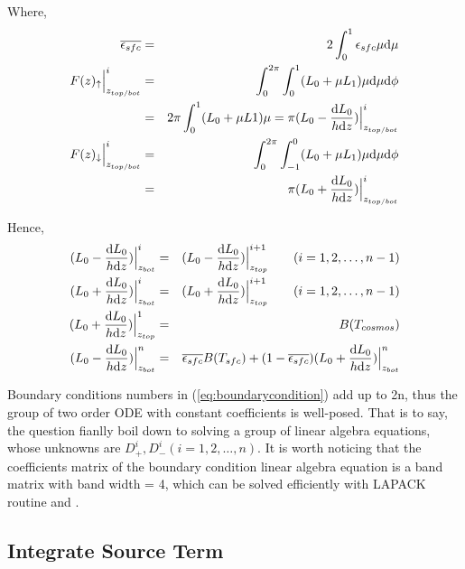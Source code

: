 \documentclass[a4paper]{report}
\begin{document}
Where,
\begin{eqnarray} \label{eq:epsilonbar}
    \overline{\epsilon_{sfc}} & = & 2\int_{0}^{1}\epsilon_{sfc}\mu \mathrm{d} \mu \nonumber\\
    F(z)_{\uparrow}\Big|_{z_{top/bot}}^{i} & = & \int_{0}^{2\pi}\int_{0}^{1}(L_{0} + \mu L_{1})\mu\mathrm{d}\mu\mathrm{d}\phi \nonumber\\
    {} & = & 2\pi\int_{0}^{1}(L_{0}+ \mu L{1})\mu = \pi (L_{0} - \frac{\mathrm{d} L_{0}}{h \mathrm{d} z})\Big|_{z_{top/bot}}^{i} \nonumber\\
    F(z)_{\downarrow}\Big|_{z_{top/bot}}^{i} & = & \int_{0}^{2\pi}\int_{-1}^{0}(L_{0} + \mu L_{1})\mu\mathrm{d}\mu\mathrm{d}\phi \nonumber\\
    {} & = & \pi (L_{0} + \frac{\mathrm{d} L_{0}}{h \mathrm{d} z})\Big|_{z_{top/bot}}^{i}
\end{eqnarray}

Hence,
\begin{eqnarray} \label{eq:boundarycondition} 
    (L_{0} - \frac{\mathrm{d} L_{0}}{h \mathrm{d} z})\Big|_{z_{bot}}^{i} & = & (L_{0} - \frac{\mathrm{d} L_{0}}{h \mathrm{d} z})\Big|_{z_{top}}^{i+1} \qquad (i=1,2,\ldots,n-1) \nonumber\\
    (L_{0} + \frac{\mathrm{d} L_{0}}{h \mathrm{d} z})\Big|_{z_{bot}}^{i} & = & (L_{0} + \frac{\mathrm{d} L_{0}}{h \mathrm{d} z})\Big|_{z_{top}}^{i+1} \qquad (i=1,2,\ldots,n-1) \nonumber\\
    (L_{0} + \frac{\mathrm{d} L_{0}}{h \mathrm{d} z})\Big|_{z_{top}}^{1} & = & B(T_{cosmos}) \nonumber\\
    (L_{0} - \frac{\mathrm{d} L_{0}}{h \mathrm{d} z})\Big|_{z_{bot}}^{n} & = & \overline{\epsilon_{sfc}} B(T_{sfc}) 
    + (1-\overline{\epsilon_{sfc}}) (L_{0} + \frac{\mathrm{d} L_{0}}{h \mathrm{d} z})\Big|_{z_{bot}}^{n}  
\end{eqnarray}

Boundary conditions numbers in (\ref{eq:boundarycondition}) add up to 2n, 
thus the group of two order ODE with constant coefficients is well-posed.
That is to say, the question fianlly boil down to solving a group of linear algebra equations, 
whose unknowns are $D_{+}^{i}, D_{-}^{i}(i=1, 2, \ldots, n)$.
It is worth noticing that the coefficients matrix of the boundary condition linear algebra equation
is a band matrix with band width = 4, which can be solved efficiently with LAPACK routine  and .

\subsection{Integrate Source Term}
\end{document}
